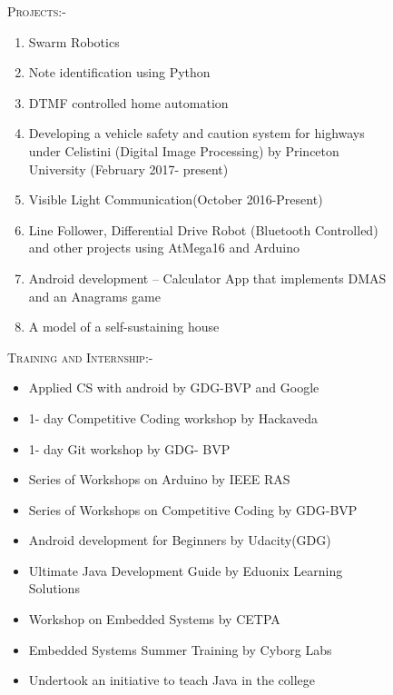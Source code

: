 \documentclass[11pt]{article}
\begin{document}
\begin{figure}[ht]
\begin{minipage}[b]{0.45\linewidth}
\flushleft
\textsc{Projects:-}\\
\begin{small}
\begin{enumerate}
\item  	Swarm Robotics
\item  Note identification using Python
\item  DTMF controlled home automation
\item  Developing a vehicle safety and caution system for highways under Celistini (Digital Image Processing) by Princeton University (February 2017- present)
\item 	Visible Light Communication(October 2016-Present)
\item 	Line Follower, Differential Drive Robot (Bluetooth Controlled) and other projects using AtMega16 and Arduino
\item  Android development – Calculator App that implements DMAS and an Anagrams game
\item  A model of a self-sustaining house
\end{enumerate}
\end{small}
\end{minipage}
\hspace{0.5cm}
\begin{minipage}[b]{0.45\linewidth}
\textsc{Training and Internship:-}
\begin{small}
\begin{itemize}
\item  	Applied CS with android by GDG-BVP and Google
\item 	1- day Competitive Coding workshop by Hackaveda
\item 	1- day Git workshop by GDG- BVP
\item 	Series of Workshops on Arduino by IEEE RAS
\item	Series of Workshops on Competitive Coding by GDG-BVP
\item 	Android development for Beginners by Udacity(GDG)
\item 	 Ultimate Java Development Guide by Eduonix Learning Solutions
\item 	Workshop  on Embedded Systems by CETPA
\item 	Embedded Systems Summer Training by Cyborg Labs
\item Undertook an initiative to teach Java in the college
\end{itemize}
\end{small}
\flushleft


\end{minipage}
\end{figure}
\end{document}
